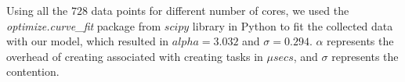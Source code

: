 Using all the $728$ data points for different number of cores, we used the \emph{optimize.curve\_{fit}} package from $scipy$ library in Python to fit the collected data with our model, which resulted in $alpha=3.032$ and $\sigma=0.294$. $\alpha$ represents the overhead of creating associated with creating tasks in $\mu{secs}$, and $\sigma$ represents the contention.

\begin{figure}[H]
	\centering
	\hfill
\end{figure}
